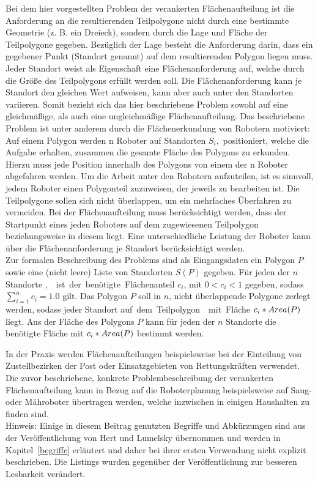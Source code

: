 \documentclass[ngerman]{seminarbeitrag}
\begin{document}
Bei dem hier vorgestellten Problem der verankerten Flächenaufteilung ist die Anforderung an die resultierenden Teilpolygone nicht durch eine bestimmte Geometrie
(z. B. ein Dreieck), sondern durch die Lage und Fläche der Teilpolygone gegeben. Bezüglich der Lage besteht die Anforderung darin, dass ein gegebener Punkt (Standort genannt) auf
dem resultierenden Polygon liegen muss. Jeder Standort weist als Eigenschaft eine Flächenanforderung auf, welche durch die Größe des Teilpolygons erfüllt werden soll. Die
Flächenanforderung kann je Standort den gleichen Wert aufweisen, kann aber auch unter den Standorten variieren. Somit bezieht sich das hier beschriebene Problem sowohl auf eine
gleichmäßige, als auch eine ungleichmäßige Flächenaufteilung. Das beschriebene Problem ist unter anderem durch die Flächenerkundung von Robotern motiviert: \\

Auf einem Polygon werden n Roboter auf Standorten $S_{i},$ \iton positioniert, welche die Aufgabe erhalten, zusammen die gesamte Fläche des Polygons zu
erkunden. Hierzu muss jede Position innerhalb des Polygons von einem der n Roboter abgefahren werden. Um die Arbeit unter den Robotern aufzuteilen, ist es sinnvoll, jedem Roboter einen Polygonteil zuzuweisen, der jeweils zu bearbeiten ist. Die Teilpolygone sollen sich nicht überlappen, um ein mehrfaches Überfahren zu vermeiden. Bei der Flächenaufteilung muss berücksichtigt werden, dass der Startpunkt eines jeden Roboters auf dem zugewiesenen Teilpolygon beziehungsweise in diesem liegt. Eine unterschiedliche Leistung der Roboter kann über die Flächenanforderung je Standort berücksichtigt werden. \\

Zur formalen Beschreibung des Problems sind als Eingangsdaten ein Polygon $P$ sowie eine (nicht leere) Liste von Standorten $S(P)$ gegeben. Für jeden der $n$
Standorte \si, \iton ist der benötigte Flächenanteil $c_{i}$, \iton mit $0 < c_{i} < 1$ gegeben, sodass $\sum_{i=1}^{n}c_{i}=1.0$ gilt. Das Polygon $P$ soll in $n$, nicht
überlappende Polygone zerlegt werden, sodass jeder Standort \si auf dem Teilpolygon \pi mit Fläche $c_{i}* Area(P)$ liegt. Aus der Fläche des Polygons $P$ kann für jeden der $n$ Standorte die benötigte Fläche mit $c_{i}* Area(P)$ bestimmt werden.

In der Praxis werden Flächenaufteilungen beispielsweise bei der Einteilung von Zustellbezirken der Post oder Einsatzgebieten von Rettungskräften verwendet. Die zuvor beschriebene, konkrete Problembeschreibung der verankerten Flächenaufteilung kann in Bezug auf die Roboterplanung beispielsweise auf Saug- oder Mähroboter übertragen werden, welche inzwischen in einigen Haushalten zu finden sind.\\
Hinweis: Einige in diesem Beitrag genutzten Begriffe und Abkürzungen sind aus der Veröffentlichung von Hert und Lumelsky \cite{Hert.1998} übernommen und werden in Kapitel~\ref{begriffe} erläutert und daher bei ihrer ersten Verwendung nicht explizit beschrieben. Die Listings wurden gegenüber der Veröffentlichung \cite{Hert.1998} zur besseren Lesbarkeit verändert.
\end{document}
